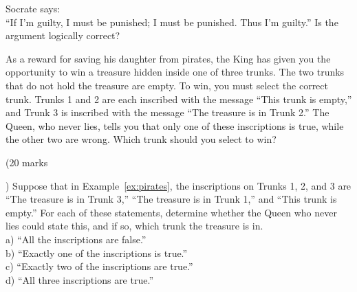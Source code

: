\begin{example}
  Socrate says:\\
“If I’m guilty, I must be punished;
I must be punished. Thus I’m guilty.”
Is the argument logically correct?
\end{example}
\vspace{2in}

\begin{example}
As a reward for saving his daughter from pirates, the King has given you the opportunity to win
a treasure hidden inside one of three trunks. The two trunks that do not hold the treasure are
empty. To win, you must select the correct trunk. Trunks 1 and 2 are each inscribed with the
message “This trunk is empty,” and Trunk 3 is inscribed with the message “The treasure is in
Trunk 2.” The Queen, who never lies, tells you that only one of these inscriptions is true, while
the other two are wrong. Which trunk should you select to win?
\label{ex:pirates}
\end{example}
\vspace{2in}

\begin{problem}(20 marks\addtocounter{marks}{20})
  Suppose that in Example~\ref{ex:pirates}, the inscriptions on Trunks 1,
2, and 3 are “The treasure is in Trunk 3,” “The treasure is
in Trunk 1,” and “This trunk is empty.” For each of these
statements, determine whether the Queen who never
lies could state this, and if so, which trunk the treasure
is in.\\
a) “All the inscriptions are false.”\\
b) “Exactly one of the inscriptions is true.”\\
c) “Exactly two of the inscriptions are true.”\\
d) “All three inscriptions are true.”\\
\end{problem}

